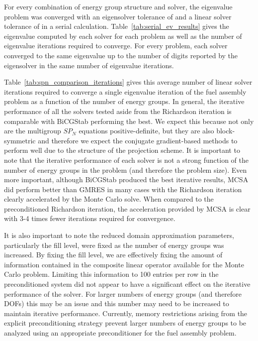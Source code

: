 \documentclass[letterpaper,12pt]{article}
\begin{document}
For every combination of energy group structure and solver, the
eigenvalue problem was converged with an eigensolver tolerance of
 and a linear solver tolerance of  in a serial
calculation. Table~\ref{tab:serial_ev_results} gives the eigenvalue
computed by each solver for each problem as well as the number of
eigenvalue iterations required to converge. For every problem, each
solver converged to the same eigenvalue up to the number of digits
reported by the eigensolver in the same number of eigenvalue
iterations.

Table~\ref{tab:spn_comparison_iterations} gives this average number of
linear solver iterations required to converge a single eigenvalue
iteration of the fuel assembly problem as a function of the number of
energy groups. In general, the iterative performance of all the
solvers tested aside from the Richardson iteration is comparable with
BiCGStab performing the best. We expect this because not only are the
multigroup $SP_N$ equations positive-definite, but they are also
block-symmetric and therefore we expect the conjugate gradient-based
methods to perform well due to the structure of the projection
scheme. It is important to note that the iterative performance of each
solver is not a strong function of the number of energy groups in the
problem (and therefore the problem size). Even more important,
although BiCGStab produced the best iterative results, MCSA did
perform better than GMRES in many cases with the Richardson iteration
clearly accelerated by the Monte Carlo solve. When compared to the
preconditioned Richardson iteration, the acceleration provided by MCSA
is clear with 3-4 times fewer iterations required for convergence.

It is also important to note the reduced domain approximation
parameters, particularly the fill level, were fixed as the number of
energy groups was increased. By fixing the fill level, we are
effectively fixing the amount of information contained in the
composite linear operator available for the Monte Carlo
problem. Limiting this information to 100 entries per row in the
preconditioned system did not appear to have a significant effect on
the iterative performance of the solver. For larger numbers of energy
groups (and therefore DOFs) this may be an issue and this number may
need to be increased to maintain iterative performance. Currently,
memory restrictions arising from the explicit preconditioning strategy
prevent larger numbers of energy groups to be analyzed using an
appropriate preconditioner for the fuel assembly problem.
\end{document}
